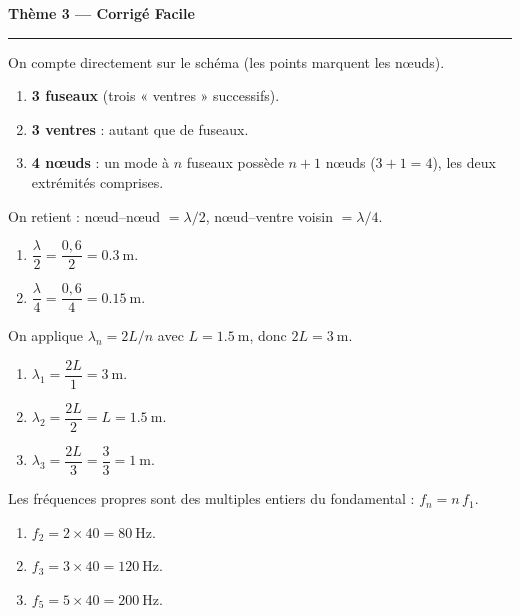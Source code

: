 \documentclass[11pt,a4paper]{article}
\begin{document}
\begin{center}
{\large\bfseries\color{excol} Thème 3 — Corrigé Facile}\\[-2pt]
{\color{excol}\rule{5cm}{1pt}}
\end{center}

\begin{corrige}
On compte directement sur le schéma (les points marquent les nœuds).
\begin{enumerate}[label=\alph*)]
  \item \textbf{3 fuseaux} (trois « ventres » successifs).
  \item \textbf{3 ventres} : autant que de fuseaux.
  \item \textbf{4 nœuds} : un mode à $n$ fuseaux possède $n+1$ nœuds ($3+1=4$),
        les deux extrémités comprises.
\end{enumerate}
\end{corrige}

\begin{corrige}
On retient : nœud--nœud $=\lambda/2$, nœud--ventre voisin $=\lambda/4$.
\begin{enumerate}[label=\alph*)]
  \item $\dfrac{\lambda}{2}=\dfrac{0{,}6}{2}=\SI{0.3}{\metre}.$
  \item $\dfrac{\lambda}{4}=\dfrac{0{,}6}{4}=\SI{0.15}{\metre}.$
\end{enumerate}
\end{corrige}

\begin{corrige}
On applique $\lambda_n=2L/n$ avec $L=\SI{1.5}{\metre}$, donc $2L=\SI{3}{\metre}$.
\begin{enumerate}[label=\alph*)]
  \item $\lambda_1=\dfrac{2L}{1}=\SI{3}{\metre}.$
  \item $\lambda_2=\dfrac{2L}{2}=L=\SI{1.5}{\metre}.$
  \item $\lambda_3=\dfrac{2L}{3}=\dfrac{3}{3}=\SI{1}{\metre}.$
\end{enumerate}
\end{corrige}

\begin{corrige}
Les fréquences propres sont des multiples entiers du fondamental : $f_n=n\,f_1$.
\begin{enumerate}[label=\alph*)]
  \item $f_2=2\times 40=\SI{80}{\hertz}.$
  \item $f_3=3\times 40=\SI{120}{\hertz}.$
  \item $f_5=5\times 40=\SI{200}{\hertz}.$
\end{enumerate}
\end{corrige}
\end{document}
